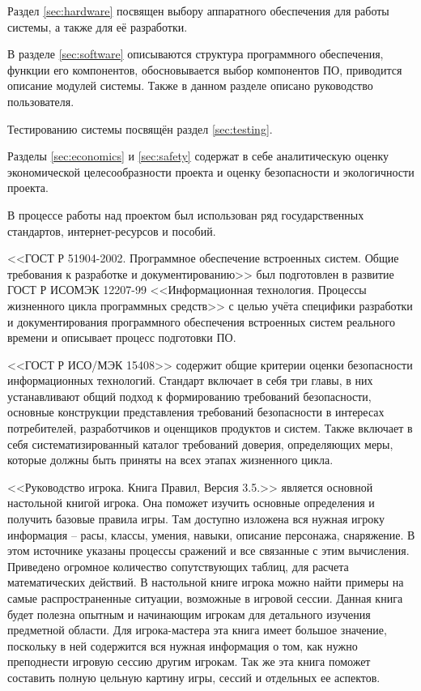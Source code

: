 Раздел \ref{sec:hardware} посвящен выбору аппаратного обеспечения для работы системы, а также для её разработки.

В разделе \ref{sec:software} описываются структура программного обеспечения, функции его компонентов, обосновывается выбор компонентов ПО, приводится описание модулей системы. Также в данном разделе описано руководство пользователя.

Тестированию системы посвящён раздел \ref{sec:testing}.

Разделы \ref{sec:economics} и \ref{sec:safety} содержат в себе аналитическую оценку экономической целесообразности проекта и оценку безопасности и экологичности проекта.

В процессе работы над проектом был использован ряд государственных стандартов, интернет-ресурсов и пособий.

<<ГОСТ Р 51904-2002. Программное обеспечение встроенных систем. Общие требования к разработке и документированию>> был подготовлен в развитие ГОСТ Р ИСО\/МЭК 12207-99 <<Информационная технология. Процессы жизненного цикла программных средств>> с целью учёта специфики разработки и документирования программного обеспечения встроенных систем реального времени и описывает процесс подготовки ПО.

<<ГОСТ Р ИСО/МЭК 15408>> содержит общие критерии оценки безопасности информационных технологий. Стандарт включает в себя три главы, в них устанавливают общий подход к формированию требований безопасности, основные конструкции представления требований безопасности в интересах потребителей, разработчиков и оценщиков продуктов и систем. Также включает в себя систематизированный каталог требований доверия, определяющих меры, которые должны быть приняты на всех этапах жизненного цикла. 

<<Руководство игрока. Книга Правил, Версия 3.5.>> является основной настольной книгой игрока. Она поможет изучить основные определения и получить базовые правила игры. Там доступно изложена вся нужная игроку информация – расы, классы, умения, навыки, описание персонажа, снаряжение. В этом источнике указаны процессы сражений и все связанные с этим вычисления. Приведено огромное количество сопутствующих таблиц, для расчета математических действий. В настольной книге игрока можно найти примеры на самые распространенные ситуации, возможные в игровой сессии. Данная книга будет полезна опытным и начинающим игрокам для детального изучения предметной области. Для игрока-мастера эта книга имеет большое значение, поскольку в ней содержится вся нужная информация о том, как нужно преподнести игровую сессию другим игрокам. Так же эта книга поможет составить полную цельную картину игры, сессий и отдельных ее аспектов.

